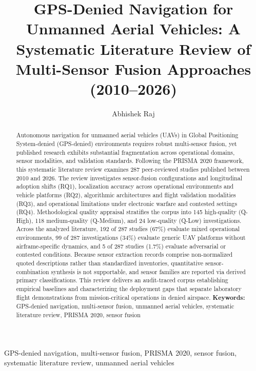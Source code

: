\documentclass[conference]{IEEEtran}
\begin{document}
\title{GPS-Denied Navigation for Unmanned Aerial Vehicles: A Systematic Literature Review of Multi-Sensor Fusion Approaches (2010–2026)}
\author{Abhishek Raj}
\maketitle

\begin{abstract}
Autonomous navigation for unmanned aerial vehicles (UAVs) in Global Positioning System-denied (GPS-denied) environments requires robust multi-sensor fusion, yet published research exhibits substantial fragmentation across operational domains, sensor modalities, and validation standards. Following the PRISMA 2020 framework, this systematic literature review examines 287 peer-reviewed studies published between 2010 and 2026. The review investigates sensor-fusion configurations and longitudinal adoption shifts (RQ1), localization accuracy across operational environments and vehicle platforms (RQ2), algorithmic architectures and flight validation modalities (RQ3), and operational limitations under electronic warfare and contested settings (RQ4). Methodological quality appraisal stratifies the corpus into 145 high-quality (Q-High), 118 medium-quality (Q-Medium), and 24 low-quality (Q-Low) investigations. Across the analyzed literature, 192 of 287 studies (67\%) evaluate mixed operational environments, 99 of 287 investigations (34\%) evaluate generic UAV platforms without airframe-specific dynamics, and 5 of 287 studies (1.7\%) evaluate adversarial or contested conditions. Because sensor extraction records comprise non-normalized quoted descriptions rather than standardized inventories, quantitative sensor-combination synthesis is not supportable, and sensor families are reported via derived primary classifications. This review delivers an audit-traced corpus establishing empirical baselines and characterizing the deployment gaps that separate laboratory flight demonstrations from mission-critical operations in denied airspace. \textbf{Keywords:} GPS-denied navigation, multi-sensor fusion, unmanned aerial vehicles, systematic literature review, PRISMA 2020, sensor fusion
\end{abstract}

\begin{IEEEkeywords}
GPS-denied navigation, multi-sensor fusion, PRISMA 2020, sensor fusion, systematic literature review, unmanned aerial vehicles
\end{IEEEkeywords}
\end{document}
